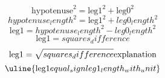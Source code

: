 \[\text{{{hypotenuse}}}^{{2}}=\text{{{leg1}}}^{{2}}+\text{{{leg0}}}^{{2}}\]
\[{hypotenuse_length}^{{2}}=\text{{{leg1}}}^{{2}}+{leg0_length}^{{2}}\]
\[\text{{{leg1}}}={hypotenuse_length}^{{2}}-{leg0_length}^{{2}}\]
\[\text{{{leg1}}}={squares_difference}\]
\[\text{{{leg1}}}=\sqrt{{\mathstrut {squares_difference}}}\text{{{explanation}}}\]
\[\uline{{\text{{{leg1}}}{equal_sign}{leg1_length_with_unit}}}\]